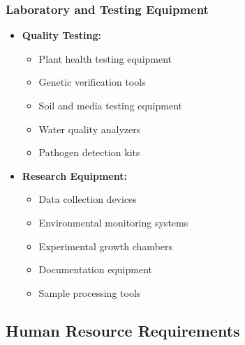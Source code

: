 \subsubsection{Laboratory and Testing Equipment}
\begin{itemize}
    \item \textbf{Quality Testing:}
    \begin{itemize}
        \item Plant health testing equipment
        \item Genetic verification tools
        \item Soil and media testing equipment
        \item Water quality analyzers
        \item Pathogen detection kits
    \end{itemize}
    
    \item \textbf{Research Equipment:}
    \begin{itemize}
        \item Data collection devices
        \item Environmental monitoring systems
        \item Experimental growth chambers
        \item Documentation equipment
        \item Sample processing tools
    \end{itemize}
\end{itemize}

\subsection{Human Resource Requirements}

